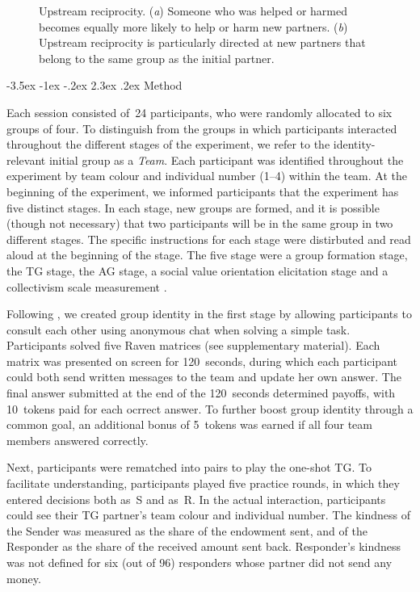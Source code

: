 \documentclass[12pt,a4paper]{article}
\makeatletter
\renewcommand\section{\@startsection {section}{1}{\z@}%
{-3.5ex \@plus -1ex \@minus -.2ex}%
{2.3ex \@plus.2ex}%
{\bf\sffamily\Large}}
\makeatother
\begin{document}
\begin{figure}
\begin{center}
\begin{subfigure}[b]{0.4\textwidth}
            \caption{}\label{group}
        \end{subfigure}
        \caption{Upstream reciprocity. (\textit{a}) Someone who was helped or harmed becomes equally more likely to help or harm new partners. (\textit{b}) Upstream reciprocity is particularly directed at new partners that belong to the same group as the initial partner.}
        \label{fig:illustration}
	\end{center}
\end{figure}

\section{Method}
\label{sec:design}

Each session consisted of~24 participants, who were randomly allocated to six groups of four. To distinguish from the groups in which participants interacted throughout the different stages of the experiment, we refer to the identity-relevant initial group as a \emph{Team}.
Each participant was identified throughout the experiment by team colour and individual number (1--4) within the team. At the beginning of the experiment, we informed participants that the experiment has five distinct stages. In each stage, new groups are formed, and it is possible (though not necessary) that two participants will be in the same group in two different stages. The specific instructions for each stage were distirbuted and read aloud at the beginning of the stage. The five stage were a group formation stage, the TG stage, the AG stage, a social value orientation elicitation \citep*{murphy2011measuring} stage and a collectivism scale measurement \citep*[adapted from the horizontal collectivism scale in][]{Singelis1995horizontal}.

Following \citet*{chen2009group}, we created group identity in the first stage by allowing participants to consult each other using anonymous chat when solving a simple task. Participants solved five Raven matrices (see supplementary material). Each matrix was presented on screen for 120~seconds, during which each participant could both send written messages to the team and update her own answer. The final answer submitted at the end of the 120~seconds determined payoffs, with 10~tokens paid for each ocrrect answer. To further boost group identity through a common goal, an additional bonus of 5~tokens was earned if all four team members answered correctly.

Next, participants were rematched into pairs to play the one-shot TG. To facilitate understanding, participants played five practice rounds, in which they entered decisions both as~S and as~R. In the actual interaction, participants could see their TG partner's team colour and individual number. The kindness of the Sender was measured as the share of the endowment sent, and of the Responder as the share of the received amount sent back. Responder's kindness was not defined for six (out of 96) responders whose partner did not send any money.
\end{document}
